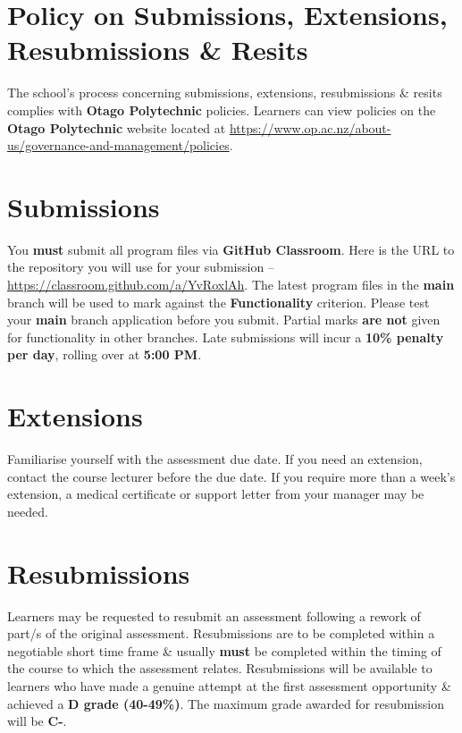 \documentclass{article}
\begin{document}
\section*{Policy on Submissions, Extensions, Resubmissions \& Resits}
The school's process concerning submissions, extensions, resubmissions \& resits complies with \textbf{Otago Polytechnic} policies. Learners can view policies on the \textbf{Otago Polytechnic} website located at \href{https://www.op.ac.nz/about-us/governance-and-management/policies}{https://www.op.ac.nz/about-us/governance-and-management/policies}.

\section*{Submissions}
You \textbf{must} submit all program files via \textbf{GitHub Classroom}. Here is the URL to the repository you will use for your submission – \href{https://classroom.github.com/a/YvRoxlAh}{https://classroom.github.com/a/YvRoxlAh}. The latest program files in the \textbf{main} branch will be used to mark against the \textbf{Functionality} criterion. Please test your \textbf{main} branch application before you submit. Partial marks \textbf{are not} given for functionality in other branches. Late submissions will incur a \textbf{10\% penalty per day}, rolling over at \textbf{5:00 PM}.

\section*{Extensions}
Familiarise yourself with the assessment due date. If you need an extension, contact the course lecturer before the due date. If you require more than a week's extension, a medical certificate or support letter from your manager may be needed.

\section*{Resubmissions}
Learners may be requested to resubmit an assessment following a rework of part/s of the original assessment. Resubmissions are to be completed within a negotiable short time frame \& usually \textbf{must} be completed within the timing of the course to which the assessment relates. Resubmissions will be available to learners who have made a genuine attempt at the first assessment opportunity \& achieved a \textbf{D grade (40-49\%)}. The maximum grade awarded for resubmission will be \textbf{C-}.
\end{document}
